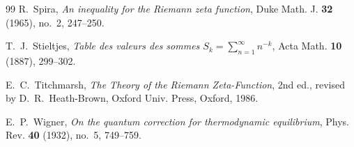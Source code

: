 \documentclass[11pt,reqno]{amsart}
\theoremstyle{definition}
\theoremstyle{remark}
\numberwithin{equation}{section}
\begin{document}
\begin{thebibliography}{99}
R.~Spira,
\emph{An inequality for the Riemann zeta function},
Duke Math. J. \textbf{32} (1965), no.~2, 247--250.

T.~J.~Stieltjes,
\emph{Table des valeurs des sommes $S_k = \sum_{n=1}^{\infty} n^{-k}$},
Acta Math. \textbf{10} (1887), 299--302.

E.~C.~Titchmarsh,
\emph{The Theory of the Riemann Zeta-Function},
2nd ed., revised by D.~R.~Heath-Brown, Oxford Univ. Press, Oxford, 1986.

E.~P.~Wigner,
\emph{On the quantum correction for thermodynamic equilibrium},
Phys. Rev. \textbf{40} (1932), no.~5, 749--759.

\end{thebibliography}
\end{document}
